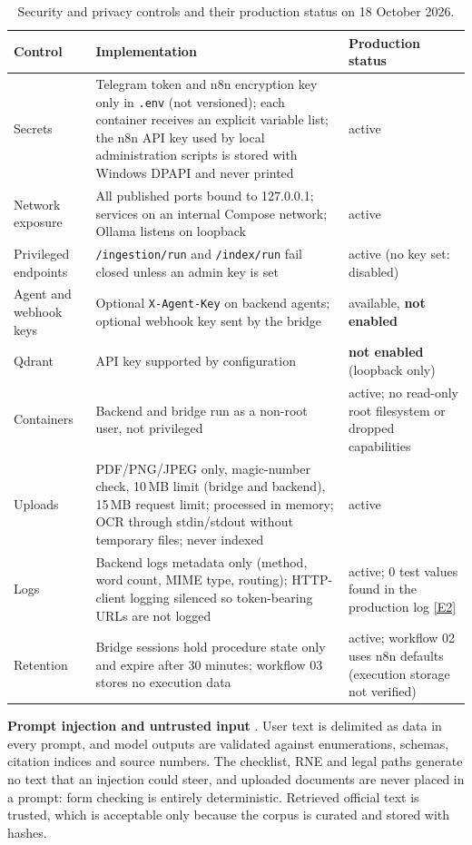 \documentclass[10pt,a4paper]{article}
\newcommand{\code}[1]{\texttt{\small #1}}
\newcommand{\ev}[1]{\hyperref[app:evidence]{[#1]}}
\begin{document}
\begin{table}[!htb]
  \centering\footnotesize
  \caption{Security and privacy controls and their production status on 18 October 2026.}\label{tab:security}
  \begin{tabularx}{\textwidth}{@{}P{3.0cm} Y P{3.3cm}@{}}
  \toprule
  Control & Implementation & Production status \\
  \midrule
  Secrets & Telegram token and n8n encryption key only in \code{.env} (not versioned); each container receives an explicit variable list; the n8n API key used by local administration scripts is stored with Windows DPAPI and never printed & active \\
  Network exposure & All published ports bound to 127.0.0.1; services on an internal Compose network; Ollama listens on loopback & active \\
  Privileged endpoints & \code{/ingestion/run} and \code{/index/run} fail closed unless an admin key is set & active (no key set: disabled) \\
  Agent and webhook keys & Optional \code{X-Agent-Key} on backend agents; optional webhook key sent by the bridge & available, \textbf{not enabled} \\
  Qdrant & API key supported by configuration & \textbf{not enabled} (loopback only) \\
  Containers & Backend and bridge run as a non-root user, not privileged & active; no read-only root filesystem or dropped capabilities \\
  Uploads & PDF/PNG/JPEG only, magic-number check, 10\,MB limit (bridge and backend), 15\,MB request limit; processed in memory; OCR through stdin/stdout without temporary files; never indexed & active \\
  Logs & Backend logs metadata only (method, word count, MIME type, routing); HTTP-client logging silenced so token-bearing URLs are not logged & active; 0 test values found in the production log \ev{E2} \\
  Retention & Bridge sessions hold procedure state only and expire after 30 minutes; workflow 03 stores no execution data & active; workflow 02 uses n8n defaults (execution storage not verified) \\
  \bottomrule
  \end{tabularx}
\end{table}

\textbf{Prompt injection and untrusted input} \cite{greshake2023injection}. User text is delimited as data in
every prompt, and model outputs are validated against enumerations, schemas, citation indices and source
numbers. The checklist, RNE and legal paths generate no text that an injection could steer, and uploaded
documents are never placed in a prompt: form checking is entirely deterministic. Retrieved official text is
trusted, which is acceptable only because the corpus is curated and stored with hashes.
\end{document}
